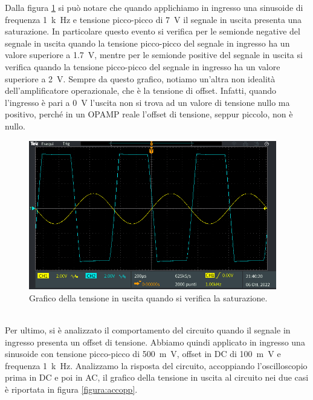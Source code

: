 \documentclass{report}
\begin{document}
Dalla figura \ref{figura:satur} si può notare che quando applichiamo in ingresso una sinusoide di frequenza \SI{1}{k\hertz} e tensione picco-picco di \SI{7}{\volt} il segnale in uscita presenta una saturazione. In particolare questo evento si verifica per le semionde negative del segnale in uscita quando la tensione picco-picco del segnale in ingresso ha un valore superiore a \SI{1.7}{\volt}, mentre per le semionde positive del segnale in uscita si verifica quando la tensione picco-picco del segnale in ingresso ha un valore superiore a \SI{2}{\volt}. Sempre da questo grafico, notiamo un'altra non idealità dell'amplificatore operazionale, che è la tensione di offset. Infatti, quando l'ingresso è pari a \SI{0}{\volt} l'uscita non si trova ad un valore di tensione nullo ma positivo, perché in un OPAMP reale l'offset di tensione, seppur piccolo, non è nullo. %
\begin{figure}[h!]
	\centering
	\includegraphics[height=6.5cm]{immagini/TEK00015}
	\caption{Grafico della tensione in uscita quando si verifica la saturazione.}
	\label{figura:satur}
\end{figure}
\\Per ultimo, si è analizzato il comportamento del circuito quando il segnale in ingresso presenta un offset di tensione. Abbiamo quindi applicato in ingresso una sinusoide con tensione picco-picco di \SI{500}{m\volt}, offset in DC di \SI{+100}{m\volt} e  frequenza \SI{1}{k\hertz}. Analizzamo la risposta del circuito, accoppiando l'oscilloscopio prima in DC  e poi in AC, il grafico della tensione in uscita al circuito nei due casi è riportata in figura \ref{figura:accopp}. \par
\end{document}
